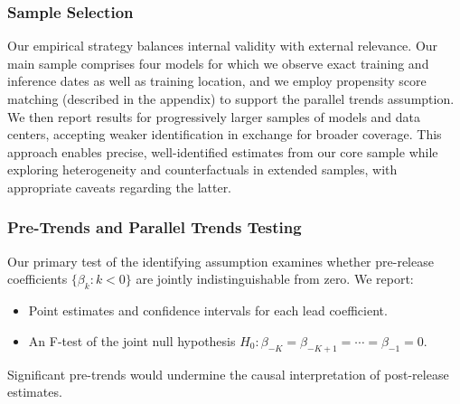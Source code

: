 \documentclass[a4paper,fleqn,longmktitle]{cas-sc}
\begin{document}
\subsubsection{Sample Selection}

Our empirical strategy balances internal validity with external relevance. Our main sample comprises four models for which we observe exact training and inference dates as well as training location, and we employ propensity score matching (described in the appendix) to support the parallel trends assumption. We then report results for progressively larger samples of models and data centers, accepting weaker identification in exchange for broader coverage. This approach enables precise, well-identified estimates from our core sample while exploring heterogeneity and counterfactuals in extended samples, with appropriate caveats regarding the latter.


\subsubsection{Pre-Trends and Parallel Trends Testing}

Our primary test of the identifying assumption examines whether pre-release coefficients $\{\beta_k : k < 0\}$ are jointly indistinguishable from zero. We report:
\begin{itemize}
    \item Point estimates and confidence intervals for each lead coefficient.
    \item An F-test of the joint null hypothesis $H_0: \beta_{-K} = \beta_{-K+1} = \cdots = \beta_{-1} = 0$.
\end{itemize}
Significant pre-trends would undermine the causal interpretation of post-release estimates.
\end{document}
